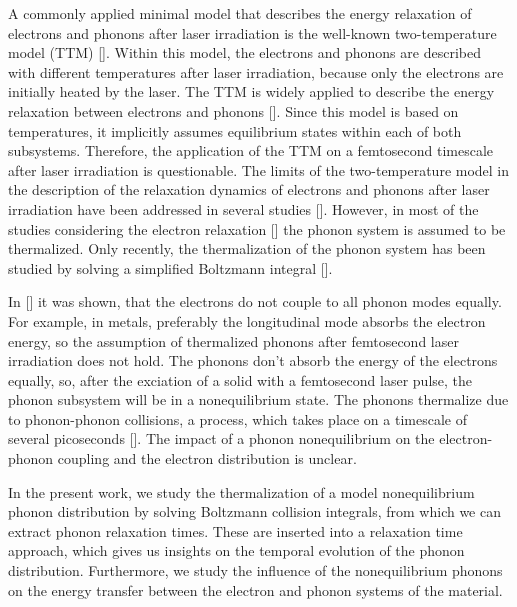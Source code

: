 \documentclass[ aps, prb, reprint, groupedaddress]{revtex4-1}
\makeatletter
\newcommand{\citen}[1]{\def\NAT@spacechar{}[\citenum{#1}]}
\makeatother
\begin{document}
A commonly applied minimal model that describes the energy relaxation of electrons and phonons after laser irradiation is the well-known two-temperature model (TTM) \citen{Anisimov74}. %
Within this model, the electrons and phonons are described with different temperatures after laser irradiation, because only the electrons are initially heated by the laser.
The TTM is widely applied to describe the energy relaxation between electrons and phonons \citen{Allen87, Lin08, Hohlfeld00}.
Since this model is based on temperatures, it implicitly assumes equilibrium states within each of both subsystems. 
Therefore,
the application of the TTM on a femtosecond timescale after laser irradiation is questionable.
The limits of the two-temperature model in the description of the relaxation dynamics of electrons and phonons after laser irradiation have been addressed in several 
studies \citen{Groeneveld92, Mueller13PRB, Rethfeld02met, Waldecker16, Carpene06, Kabanov08, Baranov14}.
However, in most of the studies considering the electron relaxation \citen{Rethfeld02met, Pietanza07, Shcheblanov13, Mueller13PRB, Medvedev11} the 
phonon system is assumed to be thermalized. Only recently, the thermalization of the phonon system has been studied by solving a simplified Boltzmann integral \citen{Ono17}.

In \citen{ZimanElPhon} it was shown, that the electrons do not couple to all phonon modes equally. 
For example, in metals, preferably the longitudinal mode absorbs the electron energy, so the assumption of thermalized phonons after 
femtosecond laser irradiation does not hold. The phonons don't absorb the energy of the electrons equally, so, after the exciation of a solid with a femtosecond laser pulse, the phonon subsystem will be in a 
nonequilibrium state. The phonons thermalize due to phonon-phonon collisions, a process, which takes place on a timescale of several picoseconds \citen{Pietanza07}.
The impact of a phonon nonequilibrium on the electron-phonon coupling and the electron distribution is unclear.

In the present work, we study the thermalization of a model nonequilibrium phonon distribution by solving Boltzmann collision integrals, from which we can extract phonon relaxation times. 
These are inserted into a relaxation 
time approach, which gives us insights on the temporal evolution of the phonon distribution. Furthermore, we study the influence of the nonequilibrium phonons on the energy transfer between the electron and 
phonon systems of the 
material.
\end{document}
